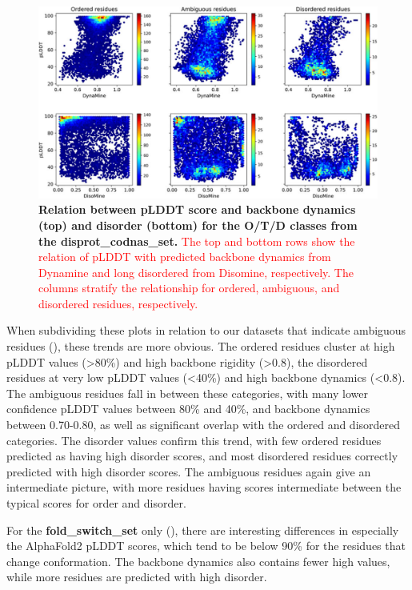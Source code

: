 \begin{figure}[tbh]
    \centering
    \includegraphics[width=\linewidth]{ambiguous//figures_ambiguous/fig6.pdf}
    \caption{\textbf{Relation between pLDDT score and backbone dynamics (top) and disorder (bottom) for the O/T/D classes from the disprot_codnas_set.} \textcolor{red}{The top and bottom rows show the relation of pLDDT with predicted backbone dynamics from Dynamine and long disordered from Disomine, respectively. The columns stratify the relationship for ordered, ambiguous, and disordered residues, respectively.}}
    \label{fig:chapter5:fig6}
\end{figure}

When subdividing these plots in relation to our datasets that indicate ambiguous residues (), these trends are more obvious. The ordered residues cluster at high pLDDT values (>80\%) and high backbone rigidity (>0.8), the disordered residues at very low pLDDT values (<40\%) and high backbone dynamics (<0.8). The ambiguous residues fall in between these categories, with many lower confidence pLDDT values between 80\% and 40\%, and backbone dynamics between 0.70-0.80, as well as significant overlap with the ordered and disordered categories. The disorder values confirm this trend, with few ordered residues predicted as having high disorder scores, and most disordered residues correctly predicted with high disorder scores. The ambiguous residues again give an intermediate picture, with more residues having scores intermediate between the typical scores for order and disorder.

For the \textbf{fold_switch_set} only (), there are interesting differences in especially the AlphaFold2 pLDDT scores, which tend to be below 90\% for the residues that change conformation. The backbone dynamics also contains fewer high values, while more residues are predicted with high disorder.

